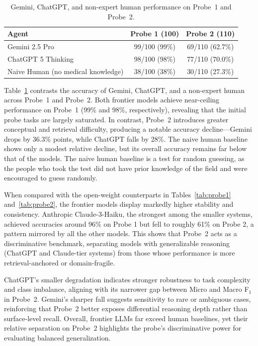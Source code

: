 \begin{table}[t]
  \centering
  \scriptsize
    \caption{Gemini, ChatGPT, and non-expert human performance on Probe~1  and Probe~2.}
    \label{tab:frontier_llm_human}
    \begin{tabular}{lcc}
      \toprule
      \textbf{Agent} & \textbf{Probe 1 (100)} & \textbf{Probe 2 (110)} \\
      \midrule
      Gemini 2.5 Pro & 99/100 (99\%) & 69/110 (62.7\%) \\
      ChatGPT 5 Thinking & 98/100 (98\%) & 77/110 (70.0\%) \\
      Naive Human (no medical knowledge) & 38/100 (38\%) & 30/110 (27.3\%) \\
      \bottomrule
    \end{tabular}
\end{table}

Table~\ref{tab:frontier_llm_human} contrasts the accuracy of Gemini, ChatGPT, and a non-expert human across Probe~1 and Probe~2. Both frontier models achieve near-ceiling performance on Probe~1 (99\% and 98\%, respectively), revealing that the initial probe tasks are largely saturated. In contrast, Probe~2 introduces greater conceptual and retrieval difficulty, producing a notable accuracy decline—Gemini drops by 36.3\% points, while ChatGPT falls by 28\%. The naive human baseline shows only a modest relative decline, but its overall accuracy remains far below that of the models. The naive human baseline is a test for random guessing, as the people who took the test did not have prior knowledge of the field and were encouraged to guess randomly.

When compared with the open-weight counterparts in Tables~\ref{tab:probe1} and~\ref{tab:probe2}, the frontier models display markedly higher stability and consistency. Anthropic Claude-3-Haiku, the strongest among the smaller systems, achieved accuracies around 96\% on Probe 1 but fell to roughly 61\% on Probe 2, a pattern mirrored by all the other models. This shows that Probe~2 acts as a discriminative benchmark, separating models with generalizable reasoning (ChatGPT and Claude-tier systems) from those whose performance is more retrieval-anchored or domain-fragile.

ChatGPT’s smaller degradation indicates stronger robustness to task complexity and class imbalance, aligning with its narrower gap between Micro and Macro F$_1$ in Probe~2. Gemini’s sharper fall suggests sensitivity to rare or ambiguous cases, reinforcing that Probe~2 better exposes differential reasoning depth rather than surface-level recall. Overall, frontier LLMs far exceed human baselines, yet their relative separation on Probe~2 highlights the probe’s discriminative power for evaluating balanced generalization.

